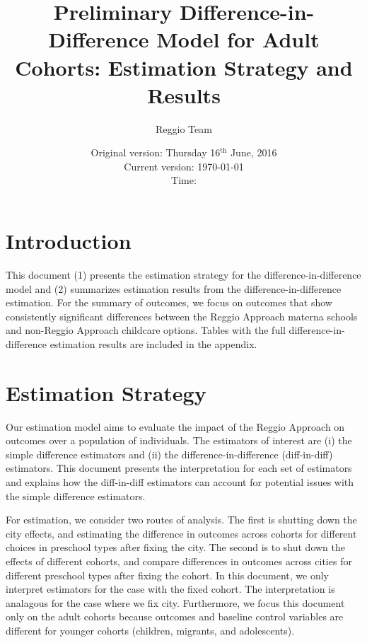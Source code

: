 \documentclass[11pt]{article}
\begin{document}
\title{Preliminary Difference-in-Difference Model for Adult Cohorts: Estimation Strategy and Results}
\author{Reggio Team}
\date{Original version: Thursday  16$^{\text{th}}$ June, 2016 \\ Current version: \today \\ \vspace{1em} Time: \currenttime}
\maketitle

\doublespacing

\section{Introduction}

This document (1) presents the estimation strategy for the difference-in-difference model and (2) summarizes estimation results from the difference-in-difference estimation. For the summary of outcomes, we focus on outcomes that show consistently significant differences between the Reggio Approach materna schools and non-Reggio Approach childcare options. Tables with the full difference-in-difference estimation results are included in the appendix. 

\section{Estimation Strategy}
Our estimation model aims to evaluate the impact of the Reggio Approach on outcomes over a population of individuals. The estimators of interest are (i) the simple difference estimators and (ii) the difference-in-difference (diff-in-diff) estimators. This document presents the interpretation for each set of estimators and explains how the diff-in-diff estimators can account for potential issues with the simple difference estimators.

For estimation, we consider two routes of analysis. The first is shutting down the city effects, and estimating the difference in outcomes across cohorts for different choices in preschool types after fixing the city. The second is to shut down the effects of different cohorts, and compare differences in outcomes across cities for different preschool types after fixing the cohort. In this document, we only interpret estimators for the case with the fixed cohort. The interpretation is analagous for the case where we fix city. Furthermore, we focus this document only on the adult cohorts because outcomes and baseline control variables are different for younger cohorts (children, migrants, and adolescents). 
\end{document}
